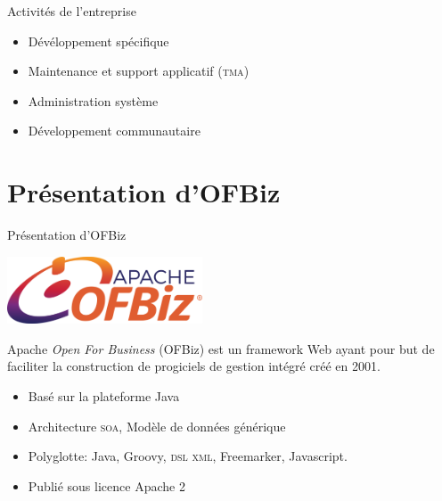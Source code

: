 \documentclass{beamer}
\begin{document}
\begin{frame}{Activités de l'entreprise}
  \begin{itemize}
  \item Dévéloppement spécifique
  \item Maintenance et support applicatif (\textsc{tma})
  \item Administration système
  \item Développement communautaire
  \end{itemize}
\end{frame}

\section{Présentation d'OFBiz}

\begin{frame}{Présentation d'OFBiz}
  \begin{center}
    \includegraphics[height=2cm]{logo_ofbiz}
  \end{center}
  Apache \emph{Open For Business} (OFBiz) est un framework Web ayant
  pour but de faciliter la construction de progiciels de gestion
  intégré créé en 2001.
  \begin{itemize}
  \item Basé sur la plateforme Java
  \item Architecture \textsc{soa}, Modèle de données générique
  \item Polyglotte: Java, Groovy, \textsc{dsl xml}, Freemarker, Javascript.
  \item Publié sous licence Apache 2
  \end{itemize}
\end{frame}
\end{document}
